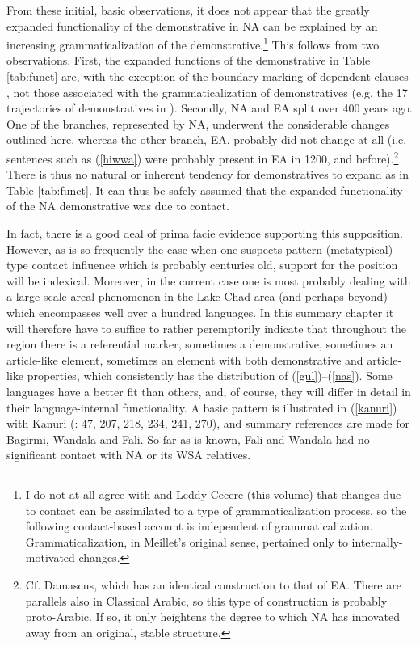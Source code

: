 \documentclass[output=paper]{langsci/langscibook}
\begin{document}
From these initial, basic observations, it does not appear that the greatly expanded functionality of the demonstrative in NA can be explained by an increasing grammaticalization of the demonstrative.\footnote{I do not at all agree with \citet{HeineKuteva2011} and Leddy-Cecere (this volume) that changes due to contact can be assimilated to a type of grammaticalization process, so the following contact-based account is independent of grammaticalization. Grammaticalization, in Meillet's original sense, pertained only to internally-motivated changes.} This follows from two observations. First, the expanded functions of the demonstrative in Table \ref{tab:funct} are, with the exception of the boundary-marking of dependent clauses , not those associated with the grammaticalization of demonstratives (e.g. the 17 trajectories of demonstratives in \citealt{Diessel1999}). Secondly, NA and EA split over 400 years ago. One of the branches, represented by NA, underwent the considerable changes outlined here, whereas the other branch, EA, probably did not change at all (i.e. sentences such as (\ref{hiwwa}) were probably present in EA in 1200, and before).\footnote{Cf. Damascus, which has an identical construction to that of EA. There are parallels also in Classical Arabic, so this type of construction is probably proto-Arabic. If so, it only heightens the degree to which NA has innovated away from an original, stable structure.} There is thus no natural or inherent tendency for demonstratives to expand as in Table \ref{tab:funct}. It can thus be safely assumed that the expanded functionality of the NA demonstrative was due to contact.

In fact, there is a good deal of prima facie evidence supporting this supposition. However, as is so frequently the case when one suspects pattern (metatypical)-type contact influence which is probably centuries old, support for the position will be indexical. Moreover, in the current case one is most probably dealing with a large-scale areal phenomenon in the Lake Chad area (and perhaps beyond) which encompasses well over a hundred languages. In this summary chapter it will therefore have to suffice to rather peremptorily indicate that throughout the region there is a referential marker, sometimes a demonstrative, sometimes an article-like element, sometimes an element with both demonstrative and article-like properties, which consistently has the distribution of (\ref{gul})–(\ref{nas}). Some languages have a better fit than others, and, of course, they will differ in detail in their language-internal functionality. A basic pattern is illustrated in (\ref{kanuri}) with Kanuri (\citealt{Hutchison1981}: 47, 207, 218, 234, 241, 270), and summary references are made for Bagirmi, Wandala and Fali. So far as is known, Fali and Wandala had no significant contact with NA or its WSA relatives.
\end{document}
